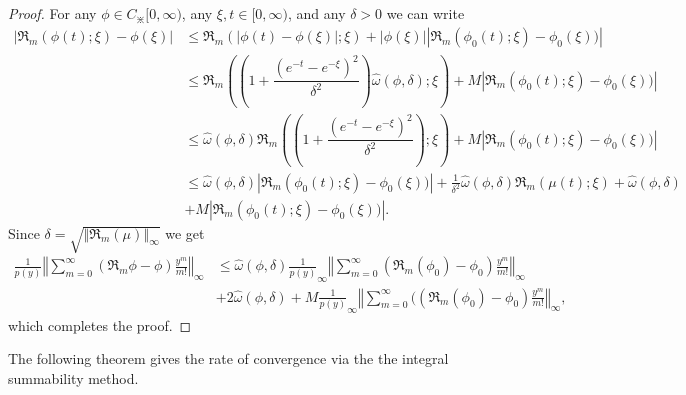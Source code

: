 \documentclass{amsart}
\theoremstyle{plain}
\numberwithin{equation}{section}
\begin{document}
\begin{proof}
For any $\phi \in C_{\divideontimes}[0,\infty)$, any $\xi,t\in \lbrack0,\infty
)$, and any $\delta>0$ we can write%
\begin{align*}
\left \vert \Re_{m}\left(  \phi(t);\xi \right)  -\phi \left(  \xi \right)
\right \vert  &  \leq \Re_{m}(\left \vert \phi \left(  t\right)  -\phi \left(
\xi \right)  \right \vert ;\xi)+\left \vert \phi(\xi)\right \vert \left \vert
\Re_{m}\left(  \phi_{0}(t);\xi \right)  -\phi_{0}(\xi))\right \vert \\
&  \leq \Re_{m}\left(  \left(  1+\dfrac{\left(  e^{-t}-e^{-\xi}\right)  ^{2}%
}{\delta^{2}}\right)  \hat{\omega}(\phi,\delta);\xi \right)  +M\left \vert
\Re_{m}\left(  \phi_{0}(t);\xi \right)  -\phi_{0}(\xi))\right \vert \\
&  \leq \hat{\omega}(\phi,\delta)\Re_{m}\left(  \left(  1+\dfrac{\left(
e^{-t}-e^{-\xi}\right)  ^{2}}{\delta^{2}}\right)  ;\xi \right)  +M\left \vert
\Re_{m}\left(  \phi_{0}(t);\xi \right)  -\phi_{0}(\xi))\right \vert \\
&  \leq \hat{\omega}(\phi,\delta)\left \vert \Re_{m}\left(  \phi_{0}%
(t);\xi \right)  -\phi_{0}(\xi))\right \vert +\frac{1}{\delta^{2}}\hat{\omega
}(\phi,\delta)\Re_{m}\left(  \mu \left(  t\right)  ;\xi \right)  +\hat{\omega
}(\phi,\delta)\\
&  +M\left \vert \Re_{m}\left(  \phi_{0}(t);\xi \right)  -\phi_{0}%
(\xi))\right \vert.
\end{align*}
Since $\delta=\sqrt{\left \Vert \Re_{m}\left(  \mu\right)
\right \Vert _{\infty}}$ we get
\begin{align*}
\frac{1}{p(y)}\left \Vert \sum \limits_{m=0}^{\infty}\left(  \Re_{m}\phi
-\phi \right)  \frac{y^{m}}{m!}\right \Vert _{\infty} &  \leq \hat{\omega}%
(\phi,\delta)\frac{1}{p(y)}_{\infty}\left \Vert \sum \limits_{m=0}^{\infty}%
(\Re_{m}\left(  \phi_{0}\right)  -\phi_{0})\frac{y^{m}}{m!}\right \Vert
_{\infty}\\
&  +2\hat{\omega}(\phi,\delta)+M\frac{1}{p(y)}_{\infty}\left \Vert
\sum \limits_{m=0}^{\infty}((\Re_{m}\left(  \phi_{0}\right)  -\phi_{0}%
)\frac{y^{m}}{m!}\right \Vert _{\infty},
\end{align*}
which completes the proof.
\end{proof}

The following theorem gives the rate of convergence via the the integral summability method.
\end{document}
